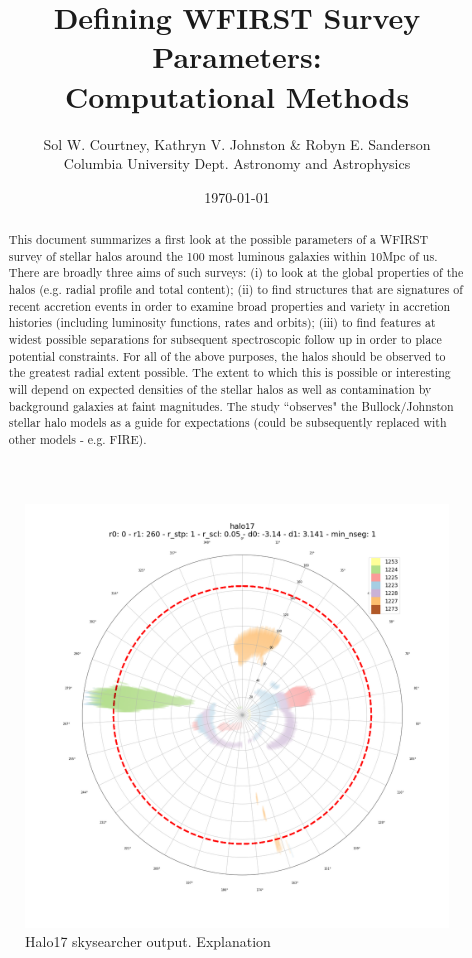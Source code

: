 \documentclass[11pt,a4paper,fleqn,notitlepage,oneside]{article}
\title{Defining WFIRST Survey Parameters: \\ Computational Methods}
\author{Sol W. Courtney, Kathryn V. Johnston \& Robyn E. Sanderson \\ Columbia University Dept. Astronomy and Astrophysics}
\date{\today}
\begin{document}
\maketitle

\begin{abstract}
	This document summarizes a first look at the possible parameters of a WFIRST survey of stellar halos around the 100 most luminous galaxies within 10Mpc of us. 
	There are broadly three aims of such surveys: (i) to look at the global properties of the halos (e.g. radial profile and total content); (ii) to find structures that are signatures of recent accretion events in order to examine broad properties and variety in accretion histories (including luminosity functions, rates and orbits); (iii) to find features at widest possible separations for subsequent spectroscopic follow up in order to place potential constraints.
	For all of the above purposes, the halos should be observed to the greatest radial extent possible.
	The extent to which this is possible or interesting will depend on expected densities of the stellar halos as well as contamination by background galaxies at faint magnitudes.
	The study “observes" the Bullock/Johnston stellar halo models as a guide for expectations (could be subsequently replaced with other models - e.g. FIRE).
\end{abstract}

\begin{figure}[H]
	\includegraphics[width=17cm]{halo17_1.png}
	\caption{
		Halo17 skysearcher output.  Explanation
	}
	\label{fig:halo17_1}
\end{figure}
\end{document}

